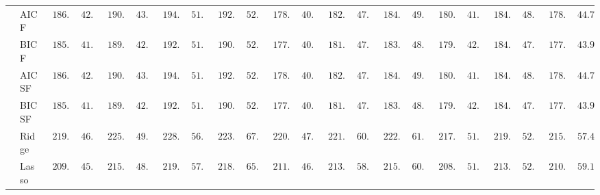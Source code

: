 \begin{tabular}{ll|ll|llllll|llllll|llllll}
 & AIC F  & $\phantom{0}186.31$ & $\phantom{0}42.89$ & $\phantom{0}190.75$ & $\phantom{0}43.32$ & $\phantom{0}194.40$ & $\phantom{0}51.64$ & $\phantom{0}192.09$ & $\phantom{0}52.27$ & $\phantom{0}178.65$ & $\phantom{0}40.04$ & $\phantom{0}182.41$ & $\phantom{0}47.39$ & $\phantom{0}184.54$ & $\phantom{0}49.44$ & $\phantom{0}180.34$ & $\phantom{0}41.30$ & $\phantom{0}184.19$ & $\phantom{0}48.00$ & $\phantom{0}178.54$ & $\phantom{0}44.71$ \\
 & BIC F  & $\phantom{0}185.38$ & $\phantom{0}41.95$ & $\phantom{0}189.04$ & $\phantom{0}42.80$ & $\phantom{0}192.16$ & $\phantom{0}51.72$ & $\phantom{0}190.20$ & $\phantom{0}52.45$ & $\phantom{0}177.76$ & $\phantom{0}40.38$ & $\phantom{0}181.31$ & $\phantom{0}47.75$ & $\phantom{0}183.49$ & $\phantom{0}48.48$ & $\phantom{0}179.60$ & $\phantom{0}42.60$ & $\phantom{0}184.08$ & $\phantom{0}47.54$ & $\phantom{0}177.65$ & $\phantom{0}43.94$ \\
 & AIC SF  & $\phantom{0}186.31$ & $\phantom{0}42.89$ & $\phantom{0}190.75$ & $\phantom{0}43.32$ & $\phantom{0}194.40$ & $\phantom{0}51.64$ & $\phantom{0}192.09$ & $\phantom{0}52.27$ & $\phantom{0}178.65$ & $\phantom{0}40.04$ & $\phantom{0}182.44$ & $\phantom{0}47.39$ & $\phantom{0}184.56$ & $\phantom{0}49.57$ & $\phantom{0}180.37$ & $\phantom{0}41.31$ & $\phantom{0}184.19$ & $\phantom{0}48.00$ & $\phantom{0}178.54$ & $\phantom{0}44.71$ \\
 & BIC SF  & $\phantom{0}185.38$ & $\phantom{0}41.95$ & $\phantom{0}189.04$ & $\phantom{0}42.80$ & $\phantom{0}192.16$ & $\phantom{0}51.72$ & $\phantom{0}190.20$ & $\phantom{0}52.45$ & $\phantom{0}177.76$ & $\phantom{0}40.38$ & $\phantom{0}181.35$ & $\phantom{0}47.71$ & $\phantom{0}183.46$ & $\phantom{0}48.50$ & $\phantom{0}179.60$ & $\phantom{0}42.60$ & $\phantom{0}184.08$ & $\phantom{0}47.54$ & $\phantom{0}177.62$ & $\phantom{0}43.97$ \\
 & Ridge  & $\phantom{0}219.63$ & $\phantom{0}46.06$ & $\phantom{0}225.25$ & $\phantom{0}49.90$ & $\phantom{0}228.86$ & $\phantom{0}56.31$ & $\phantom{0}223.26$ & $\phantom{0}67.66$ & $\phantom{0}220.25$ & $\phantom{0}47.96$ & $\phantom{0}221.13$ & $\phantom{0}60.63$ & $\phantom{0}222.01$ & $\phantom{0}61.44$ & $\phantom{0}217.63$ & $\phantom{0}51.45$ & $\phantom{0}219.68$ & $\phantom{0}52.47$ & $\phantom{0}215.48$ & $\phantom{0}57.48$ \\
 & Lasso  & $\phantom{0}209.98$ & $\phantom{0}45.23$ & $\phantom{0}215.02$ & $\phantom{0}48.24$ & $\phantom{0}219.94$ & $\phantom{0}57.03$ & $\phantom{0}218.19$ & $\phantom{0}65.89$ & $\phantom{0}211.81$ & $\phantom{0}46.35$ & $\phantom{0}213.58$ & $\phantom{0}58.13$ & $\phantom{0}215.59$ & $\phantom{0}60.20$ & $\phantom{0}208.58$ & $\phantom{0}51.04$ & $\phantom{0}213.19$ & $\phantom{0}52.02$ & $\phantom{0}210.28$ & $\phantom{0}59.13$ \\

\end{tabular}
